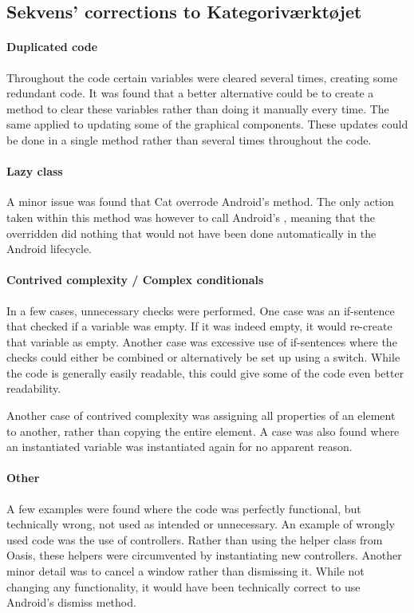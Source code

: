 \subsection{Sekvens' corrections to Kategoriværktøjet}\label{subsec:collab_catcorrections}

\paragraph{Duplicated code}
Throughout the code certain variables were cleared several times, creating some redundant code. It was found that a better alternative could be to create a method to clear these variables rather than doing it manually every time. The same applied to updating some of the graphical components. These updates could be done in a single method rather than several times throughout the code.

\paragraph{Lazy class}
A minor issue was found that Cat overrode Android's  method. The only action taken within this method was however to call Android's , meaning that the overridden  did nothing that would not have been done automatically in the Android lifecycle.

\paragraph{Contrived complexity / Complex conditionals}
In a few cases, unnecessary checks were performed. One case was an if-sentence that checked if a variable was empty. If it was indeed empty, it would re-create that variable as empty.
Another case was excessive use of if-sentences where the checks could either be combined or alternatively be set up using a switch.
While the code is generally easily readable, this could give some of the code even better readability.

Another case of contrived complexity was assigning all properties of an element to another, rather than copying the entire element.
A case was also found where an instantiated variable was instantiated again for no apparent reason.

\paragraph{Other}
A few examples were found where the code was perfectly functional, but technically wrong, not used as intended or unnecessary.
An example of wrongly used code was the use of controllers. Rather than using the helper class from Oasis, these helpers were circumvented by instantiating new controllers.
Another minor detail was to cancel a window rather than dismissing it. While not changing any functionality, it would have been technically correct to use Android's dismiss method.

